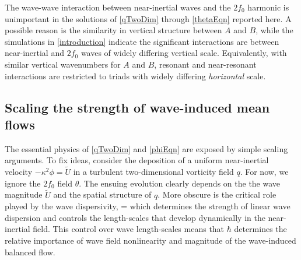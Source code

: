 \documentclass[12pt, oneside]{book}
\begin{document}
\begin{subappendices}
The wave-wave interaction between near-inertial waves and the $2f_0$ harmonic is unimportant in the solutions of \eqref{qTwoDim} through \eqref{thetaEqn} reported here.  A possible reason is the similarity in vertical structure between $A$ and $B$, while the simulations in \ch \ref{introduction} indicate the significant interactions are between near-inertial and $2f_0$ waves of widely differing vertical scale.  Equivalently, with similar vertical wavenumbers for $A$ and $B$, resonant and near-resonant interactions are restricted to triads with widely differing \textit{horizontal} scale.  


\subsection{Scaling the strength of wave-induced mean flows}
\label{stimulatedScalingArguments}

The essential physics of \eqref{qTwoDim} and \eqref{phiEqn} are exposed by simple scaling arguments.  To fix ideas, consider the deposition of a uniform near-inertial velocity $-\kappa^2 \phi = \tilde U$ in a turbulent two-dimensional vorticity field $q$.  For now, we ignore the $2f_0$ field $\theta$.  The ensuing evolution clearly depends on the the wave magnitude $\tilde U$ and the spatial structure of $q$.  More obscure is the critical role played by the wave dispersivity, 
\beq
\hbar {} {} =  \com
\eeq
which determines the strength of linear wave dispersion and controls the length-scales that develop dynamically in the near-inertial field.  This control over wave length-scales means that $\hbar$ determines the relative importance of wave field nonlinearity and magnitude of the wave-induced balanced flow.


\end{subappendices}
\end{document}
